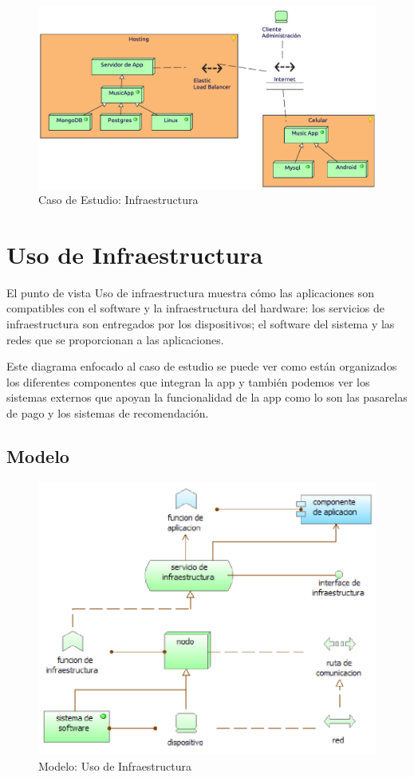 \begin{figure}[h!]
	\centering
	\includegraphics[width=\linewidth]{Arquitectura/Tecnologia/imgs/insfraestructura.pdf}
	\caption{Caso de Estudio: Infraestructura}
\end{figure}

\newpage

\section{Uso de Infraestructura}
El punto de vista Uso de infraestructura muestra cómo las aplicaciones son compatibles con el software y la infraestructura del hardware: los servicios de infraestructura son entregados por los dispositivos; el software del sistema y las redes que se proporcionan a las aplicaciones. \cite{ArchiMat55:online} \vspace{\baselineskip}

Este diagrama enfocado al caso de estudio se puede ver como están organizados los diferentes componentes que integran la app y también podemos ver los sistemas externos que apoyan la funcionalidad de la app como lo son las pasarelas de pago y los sistemas de recomendación.
\subsection{Modelo}
\begin{figure}[h!]
	\centering
	\includegraphics[width=0.8\linewidth]{Arquitectura/Tecnologia/imgs/uso.PNG}
	\caption{Modelo: Uso de Infraestructura}
\end{figure}
\newpage
